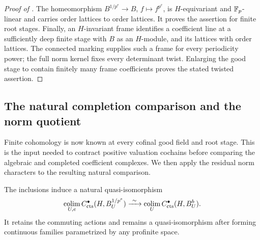 \begin{proof}[Proof of ]
The homeomorphism $B^{1/p^e}\to B$, $f\mapsto f^{p^e}$, is
$H$-equivariant and $\mathbb F_p$-linear and carries order lattices to order
lattices.  It proves the assertion for finite root stages.  Finally,
an $H$-invariant frame identifies a coefficient line at a sufficiently
deep finite stage with $B$ as an $H$-module, and its lattices with order
lattices.  The connected marking supplies such a frame for every
periodicity power; the full norm kernel fixes every determinant twist.
Enlarging the good stage to contain finitely many frame coefficients
proves the stated twisted assertion.
\end{proof}

\subsection{The natural completion comparison and the norm quotient}

Finite cohomology is now known at every cofinal good field and root
stage.  This is the input needed to contract positive valuation
cochains before comparing the algebraic and completed coefficient
complexes.  We then apply the residual norm characters to the resulting
natural comparison.

\begin{lemma}\label{h3:co:decompletion}
The inclusions induce a natural quasi-isomorphism
\begin{equation}\label{h3:co:decompletion-map}
 \operatorname*{colim}_{U,e}C^\bullet_{\mathrm{cts}}(H,B_U^{1/p^e})
 \xrightarrow{\ \sim\ }
 \operatorname*{colim}_U C^\bullet_{\mathrm{cts}}(H,B_U^b).
\end{equation}
It retains the commuting actions and remains a quasi-isomorphism after
forming continuous families parametrized by any profinite space.
\end{lemma}

